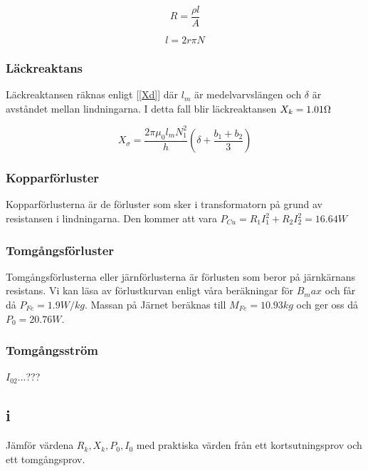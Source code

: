 \documentclass{article}
\begin{document}
\begin{equation}
  R=\frac{\rho l}{A}
  \label{R}
\end{equation}

\begin{equation}
  l=2 r \pi N
  \label{L}
\end{equation}

\subsubsection{Läckreaktans}
Läckreaktansen räknas enligt [\ref{Xd}] där $l_m$ är medelvarvslängen och $\delta$ är avståndet mellan lindningarna.
I detta fall blir läckreaktansen $X_k=1.01 \ohm $

\begin{equation}
  X_\sigma = \frac{2 \pi \mu_0 l_m N_1^2}{h} (\delta + \frac{b_1 + b_2}{3})
  \label{Xd}
\end{equation}

\subsubsection{Kopparförluster}
Kopparförlusterna är de förluster som sker i transformatorn på grund av resistansen i lindningarna.
Den kommer att vara $P_{Cu}=R_1 I_1^2 +R_2I_2^2=16.64 W$

\subsubsection{Tomgångsförluster}
Tomgångsförlusterna eller järnförlusterna är förlusten som beror på järnkärnans resistans.
Vi kan läsa av förlustkurvan enligt våra beräkningar för $B_max$ och får då $P_{Fe}=1.9 W/kg$.
Massan på Järnet beräknas till $M_{Fe}= 10.93 kg$ och ger oss då $P_0=20.76 W$.


\subsubsection{Tomgångsström}
$I_{02}$...???

\subsection{i}
Jämför värdena $R_k,X_k,P_0,I_0$ med praktiska värden från ett kortsutningsprov och ett tomgångsprov.
\end{document}
